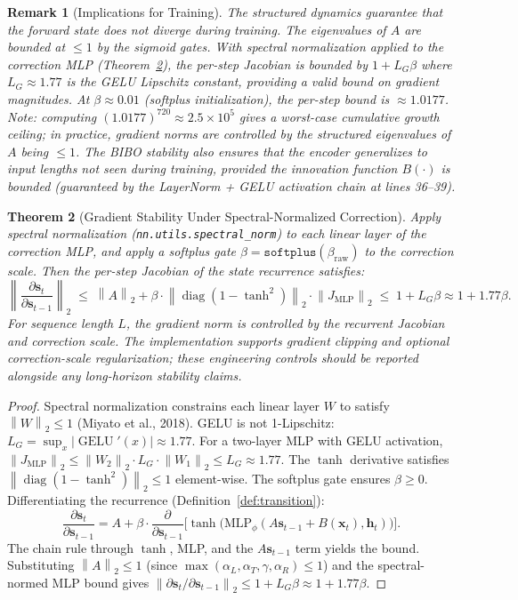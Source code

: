 \documentclass[11pt]{article}
\newtheorem{theorem}{Theorem}[section]
\newtheorem{remark}[theorem]{Remark}
\newcommand{\norm}[1]{\left\lVert#1\right\rVert}
\begin{document}
\begin{remark}[Implications for Training]
The structured dynamics guarantee that the forward state does not diverge during training. The eigenvalues of $A$ are bounded at $\leq 1$ by the sigmoid gates. With spectral normalization applied to the correction MLP (Theorem~\ref{thm:gradient-stability}), the per-step Jacobian is bounded by $1 + L_G\beta$ where $L_G \approx 1.77$ is the GELU Lipschitz constant, providing a valid bound on gradient magnitudes. At $\beta \approx 0.01$ (softplus initialization), the per-step bound is $\approx 1.0177$. Note: computing $(1.0177)^{720} \approx 2.5\times 10^5$ gives a worst-case cumulative growth ceiling; in practice, gradient norms are controlled by the structured eigenvalues of $A$ being $\leq 1$. The BIBO stability also ensures that the encoder generalizes to input lengths not seen during training, provided the innovation function $B(\cdot)$ is bounded (guaranteed by the LayerNorm + GELU activation chain at lines 36--39).
\end{remark}

\begin{theorem}[Gradient Stability Under Spectral-Normalized Correction]\label{thm:gradient-stability}
Apply spectral normalization (\texttt{nn.utils.spectral\_norm}) to each linear layer of the correction MLP, and apply a softplus gate $\beta = \texttt{softplus}(\beta_{\text{raw}})$ to the correction scale. Then the per-step Jacobian of the state recurrence satisfies:
\[
\norm{\frac{\partial \mathbf{s}_t}{\partial \mathbf{s}_{t-1}}}_2 \;\leq\; \norm{A}_2 + \beta \cdot \norm{\operatorname{diag}(1-\tanh^2)}_{2} \cdot \norm{J_{\text{MLP}}}_{2}
\;\leq\; 1 + L_G \beta \approx 1 + 1.77\beta.
\]
For sequence length $L$, the gradient norm is controlled by the recurrent Jacobian and correction scale. The implementation supports gradient clipping and optional correction-scale regularization; these engineering controls should be reported alongside any long-horizon stability claims.
\end{theorem}
\begin{proof}
Spectral normalization constrains each linear layer $W$ to satisfy $\norm{W}_2 \leq 1$ (Miyato et al., 2018). GELU is not 1-Lipschitz: $L_G = \sup_x |\operatorname{GELU}'(x)| \approx 1.77$. For a two-layer MLP with GELU activation, $\norm{J_{\text{MLP}}}_2 \leq \norm{W_2}_2 \cdot L_G \cdot \norm{W_1}_2 \leq L_G \approx 1.77$. The $\tanh$ derivative satisfies $\norm{\operatorname{diag}(1-\tanh^2)}_2 \leq 1$ element-wise. The softplus gate ensures $\beta \geq 0$. Differentiating the recurrence (Definition~\ref{def:transition}):
\[
\frac{\partial \mathbf{s}_t}{\partial \mathbf{s}_{t-1}} = A + \beta \cdot \frac{\partial}{\partial \mathbf{s}_{t-1}}\Big[\tanh\big(\text{MLP}_\phi(A\mathbf{s}_{t-1} + B(\mathbf{x}_t), \mathbf{h}_t)\big)\Big].
\]
The chain rule through $\tanh$, MLP, and the $A\mathbf{s}_{t-1}$ term yields the bound. Substituting $\norm{A}_2 \leq 1$ (since $\max(\alpha_L, \alpha_T, \gamma, \alpha_R) \leq 1$) and the spectral-normed MLP bound gives $\norm{\partial \mathbf{s}_t / \partial \mathbf{s}_{t-1}}_2 \leq 1 + L_G\beta \approx 1 + 1.77\beta$.
\end{proof}
\end{document}
